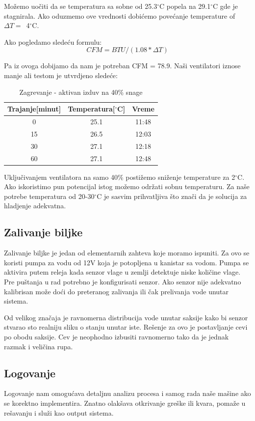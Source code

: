 \documentclass[a4paper,11pt]{book}
\begin{document}
Možemo uočiti da se temperatura sa sobne od 25.3$^\circ$C popela na 29.1$^\circ$C gde je stagnirala. Ako oduzmemo ove vrednosti dobićemo povećanje temperature of $\Delta T =$~4$^\circ$C.

Ako pogledamo sledeću formulu: 
\[ CFM = BTU / (1.08 * \Delta T)\]

Pa iz ovoga dobijamo da nam je potreban CFM = 78.9. Naši ventilatori iznose manje ali testom je utvrdjeno sledeće:\\

\begin{table}[ht]
  \caption{Zagrevanje - aktivan izduv na 40\% snage}
  \centering
  \begin{tabular}{|c|c|c|}
  \hline
    Trajanje[minut] & Temperatura[$^\circ$C] & Vreme\\ \hline
  0 & 25.1 & 11:48 \\ \hline
  15 & 26.5 & 12:03 \\ \hline
  30 & 27.1 & 12:18 \\ \hline
  60 & 27.1 & 12:48 \\ \hline
  \end{tabular}
\end{table}

Uključivanjem ventilatora na samo 40\% postižemo sniženje temperature za 2$^\circ$C. Ako iskoristimo pun potencijal istog možemo održati sobnu temperaturu.
Za naše potrebe temperatura od 20-30$^\circ$C je sasvim prihvatljiva što znači da je solucija za hladjenje adekvatna.

\subsection{Zalivanje biljke}
Zalivanje biljke je jedan od elementarnih zahteva koje moramo ispuniti. Za ovo se koristi pumpa za vodu od 12V koja je potopljena u kanistar sa vodom. Pumpa se aktivira putem releja kada senzor vlage u zemlji detektuje niske količine vlage. Pre puštanja u rad potrebno je konfigurisati senzor. Ako senzor nije adekvatno kalibrisan može doći do preteranog zalivanja ili čak prelivanja vode unutar sistema.

\noindent Od velikog značaja je ravnomerna distribucija vode unutar saksije kako bi senzor stvarao sto realniju sliku o stanju unutar iste. Rešenje za ovo je postavljanje cevi po obodu saksije. Cev je neophodno izbusiti ravnomerno tako da je jednak razmak i veličina rupa.

\subsection{Logovanje}
Logovanje nam omogućava detaljnu analizu procesa i samog rada naše mašine ako se korektno implementira. Znatno olakšava otkrivanje greške ili kvara, pomaže u rešavanju i služi kao output sistema. 
\end{document}
